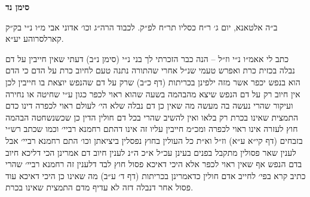 \documentclass[12pt, openany]{book}
\newcommand{\chapname}{}
\newcommand{\newchap}[1]{
	\addcontentsline{toc}{chapter}{#1}
	\renewcommand{\chapname}{#1}
		\begin{center}
			\textbf{%
\fontsize{16pt}{16pt}\selectfont
				#1}
		\end{center}
}
\begin{document}
\newchap{סימן נד}
\begin{multicols}{2}
ב״ה אלטאנא, יום ג׳ ר״ח כסליו תר״ח לפ״ק. לכבוד הרה״ג וכו׳ אדוני אבי מ״ו נ״י בק״ק קארלסרוהע יע״א.\\\vspace{0pt}

כתב לי אאמ״ו נ״י וז״ל – הנה כבר הזכרתי לך בני נ״י (סימן נ״ב) דעתי שאין חייבין על דם נבלה בכזית כרת ואפרש טעמי שנ״ל אחרי שהתורה נתנה טעם לחיוב כרת על הדם כי הדם הוא בנפש יכפר אשר מזה ילפינן בכריתות (דף כ״ב) שרק על דם שהנפש יוצאת בו חייבין לכן אין חיוב רק על דם הנפש שיצא מהבהמה בשעה שהוא ראוי לכפר כגון ע״י שחיטה או נחירה ועיקור שהרי נעשה בה מעשה מה שאין כן דם נבלה שלא הי׳ לעולם ראוי לכפרה דינו כדם התמצית שאינו בכרת רק בלאו ואין להשיב שהרי בכל דם חולין הדין כן שכשנשחטה הבהמה חוץ לעזרה אינו ראוי לכפרה ומכ״מ חייבין עליו זה אינו דהתם רחמנא רביי׳ וכמו שכתב רש״י בזבחים (דף קי״א ע״א) וז״ל וא״ת כל העולין בחוץ נפסלין ביציאתן וכו׳ התם רחמנא רביי׳ אבל לענין שאר פסולין מתקבל בפנים בעינן עכ״ל א״כ ה״נ לענין חיוב דם אמרינן הכי דליכא חיוב בדם הנפש אף שאין ראוי לכפר אלא היכי דאיכא פסול חוץ לבד דלענין זה רחמנא רביי׳ שהרי כתיב קרא בפי׳ לחייב אדם חולין כדאמרינן בכריתות (דף ד׳ ע״ב) מה שאינו כן היכי דאיכא עוד פסול אחר דנבלה דזה לא עדיף מדם התמצית שאינו בכרת.\\\vspace{0pt}


\end{multicols}
\end{document}
